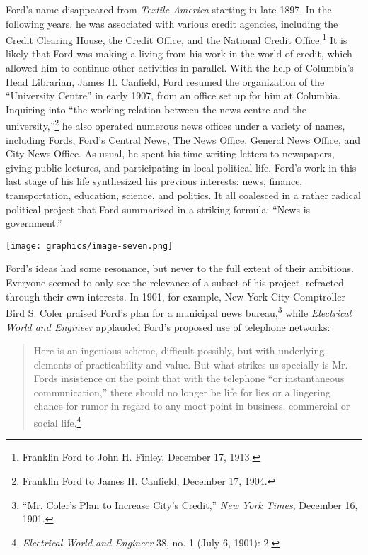 \documentclass[openany,nobib]{tufte-book}
\begin{document}
Ford's name disappeared from \emph{Textile America} starting in late
1897. In the following years, he was associated with various credit
agencies, including the Credit Clearing House, the Credit Office, and
the National Credit Office.\footnote{Franklin Ford to John H. Finley,
  December 17, 1913.} It is likely that Ford was making a living from
his work in the world of credit, which allowed him to continue other
activities in parallel. With the help of Columbia's Head Librarian,
James H. Canfield, Ford resumed the organization of the ``University
Centre'' in early 1907, from an office set up for him at Columbia.
Inquiring into ``the working relation between the news centre and the
university,''\footnote{Franklin Ford to James H. Canfield, December 17,
  1904.} he also operated numerous news offices under a variety of
names, including Fords, Ford's Central News, The News Office, General
News Office, and City News Office. As usual, he spent his time writing
letters to newspapers, giving public lectures, and participating in
local political life. Ford's work in this last stage of his life
synthesized his previous interests: news, finance, transportation,
education, science, and politics. It all coalesced in a rather radical
political project that Ford summarized in a striking formula: ``News is
government.''

\begin{figure*}
   \texttt{[image: graphics/image-seven.png]}
   \label{fig:fig7}
  \centering{}
\end{figure*}

Ford's ideas had some resonance, but never to the full extent of their
ambitions. Everyone seemed to only see the relevance of a subset of his
project, refracted through their own interests. In 1901, for example,
New York City Comptroller Bird S. Coler praised Ford's plan for a
municipal news bureau,\footnote{``Mr. Coler's Plan to Increase City's
  Credit,'' \emph{New York Times}, December 16, 1901.} while
\emph{Electrical World and Engineer} applauded Ford's proposed use of
telephone networks:

\begin{quote}
Here is an ingenious scheme, difficult possibly, but with underlying
elements of practicability and value. But what strikes us specially is
Mr. Ford\textquotesingle s insistence on the point that with the
telephone ``or instantaneous communication,'' there should no longer be
life for lies or a lingering chance for rumor in regard to any moot
point in business, commercial or social life.\footnote{\emph{Electrical
  World and Engineer} 38, no. 1 (July 6, 1901): 2.}
\end{quote}
\end{document}
